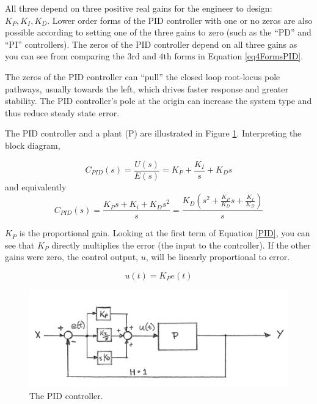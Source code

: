 All three depend on three positive real gains for the engineer to design: $K_P, K_I, K_D$.
Lower order forms of the PID
controller with one or no zeros are also possible according to setting one of the three gains to
zero (such as the ``PD'' and ``PI'' controllers).
The zeros of the PID controller depend on all three gains as you can see from comparing the 3rd
and 4th forms in Equation \ref{eq4FormsPID}.

The zeros of the PID controller can ``pull'' the closed loop root-locus
pole pathways, usually towards the left, which drives faster response and greater stability.
The PID controller's pole at the origin can increase the system type and thus reduce
steady state error.


The PID controller and a  plant (P) are illustrated in Figure \ref{PIDBlockDiagram}. Interpreting the block diagram,

\begin{equation}\label{PID}
C_{PID}(s) = \frac{U(s)}{E(s)} = K_P + \frac{K_I}{s} + K_Ds
\end{equation}
and equivalently
\begin{equation}\label{PID2}
C_{PID}(s) =  \frac{K_Ps+K_i + K_Ds^2}{s} = \frac{K_D(s^2 + \frac{K_P}{K_D}s + \frac{K_I}{K_D})}{s}
\end{equation}



{\bf $K_P$}  is the proportional gain.
Looking at the first term of Equation \ref{PID}, you can see that $K_P$ directly multiplies the error (the input to the controller).  If the other gains were zero, the control output, $u$, will be  linearly proportional to error.	%

\[
u(t) = K_P e(t)
\]



\begin{figure}\centering
\includegraphics[width=5.0in]{figs11/00651a.png}
\caption{The PID controller.}\label{PIDBlockDiagram}
\end{figure}


